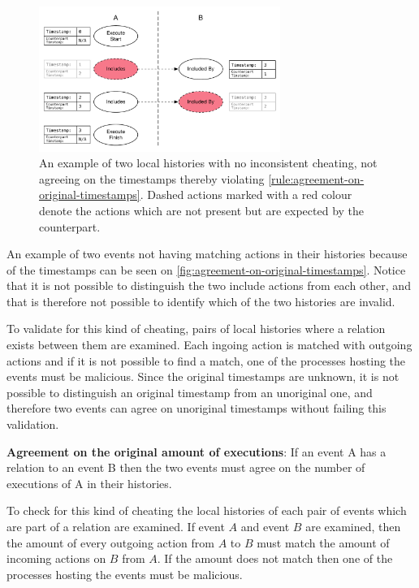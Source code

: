 	\begin{figure}[H]
		\centering
		\includegraphics[width=0.7\textwidth]{5validation/images/agreement-on-original-timestamps.pdf}
		\caption{An example of two local histories with no inconsistent cheating, not agreeing on the timestamps thereby violating \autoref{rule:agreement-on-original-timestamps}. Dashed actions marked with a red colour denote the actions which are not present but are expected by the counterpart.}
		\label{fig:agreement-on-original-timestamps}
	\end{figure}
	
	An example of two events not having matching actions in their histories because of the timestamps can be seen on \autoref{fig:agreement-on-original-timestamps}. Notice that it is not possible to distinguish the two include actions from each other, and that is therefore not possible to identify which of the two histories are invalid.
	
	\newpar To validate for this kind of cheating, pairs of local histories where a relation exists between them are examined. Each ingoing action is matched with outgoing actions and if it is not possible to find a match, one of the processes hosting the events must be malicious. Since the original timestamps are unknown, it is not possible to distinguish an original timestamp from an unoriginal one, and therefore two events can agree on unoriginal timestamps without failing this validation.
	
	\begin{ruledef}
		\textbf{Agreement on the original amount of executions}: If an event A has a relation to an event B then the two events must agree on the number of executions of A in their histories.%
		\label{rule:agreement-on-the-original-amount-of-executions}
	\end{ruledef}
	
	\noindent To check for this kind of cheating the local histories of each pair of events which are part of a relation are examined. If event $A$ and event $B$ are examined, then the amount of every outgoing action from $A$ to $B$ must match the amount of incoming actions on $B$ from $A$. If the amount does not match then one of the processes hosting the events must be malicious.
	
